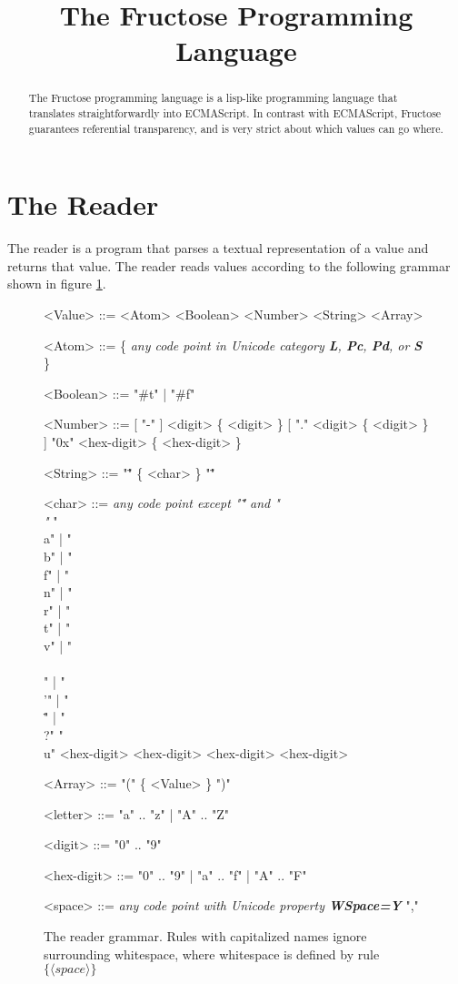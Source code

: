 \documentclass[a4paper]{article}
\title{The Fructose Programming Language}
\begin{document}
\maketitle

\begin{abstract}
The Fructose programming language is a lisp-like programming language that translates straightforwardly into ECMAScript. In contrast with ECMAScript, Fructose guarantees referential transparency, and is very strict about which values can go where.
\end{abstract}

\section{The Reader}

The reader is a program that parses a textual representation of a value and returns that value. The reader reads values according to the following grammar shown in figure \ref{fig:readergrammar}.

\begin{figure}[h]
\label{fig:readergrammar}
\caption{The reader grammar. Rules with capitalized names ignore surrounding whitespace, where whitespace is defined by rule $\{ \langle space \rangle \}$}
\begin{grammar}
<Value> ::= <Atom>
\alt <Boolean>
\alt <Number>
\alt <String>
\alt <Array>

<Atom> ::= \{ {\it any code point in Unicode category {\bf L}, {\bf Pc}, {\bf Pd}, or {\bf S}} \}

<Boolean> ::= "#t" | "#f"

<Number> ::= [ "-" ] <digit> \{ <digit> \} [ "." <digit> \{ <digit> \} ]
\alt "0x" <hex-digit> \{ <hex-digit> \}

<String> ::= "\"" \{ <char> \} "\""

<char> ::= {\it any code point except "\"" and "\\"}
\alt "\\a" | "\\b" | "\\f" | "\\n" | "\\r" | "\\t" | "\\v" | "\\\\" | "\\'" | "\\\"" | "\\?"
\alt "\\u" <hex-digit> <hex-digit> <hex-digit> <hex-digit>

<Array> ::= "(" \{ <Value> \} ")"

<letter> ::= "a" .. "z" | "A" .. "Z"

<digit> ::= "0" .. "9"

<hex-digit> ::= "0" .. "9" | "a" .. "f" | "A" .. "F"

<space> ::= {\it any code point with Unicode property {\bf WSpace=Y}}
\alt ","

\end{grammar}
\end{figure}
\end{document}
